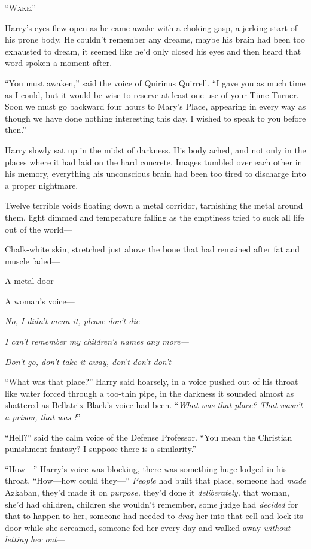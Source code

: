 \lettrine[lraise=.2]{“W}{ake.”}

\quad\quad\quad Harry’s eyes flew open as he came awake with a choking gasp, a jerking start of his prone body. He couldn’t remember any dreams, maybe his brain had been too exhausted to dream, it seemed like he’d only closed his eyes and then heard that word spoken a moment after.

“You must awaken,” said the voice of Quirinus Quirrell. “I gave you as much time as I could, but it would be wise to reserve at least one use of your Time-Turner. Soon we must go backward four hours to Mary’s Place, appearing in every way as though we have done nothing interesting this day. I wished to speak to you before then.”

Harry slowly sat up in the midst of darkness. His body ached, and not only in the places where it had laid on the hard concrete. Images tumbled over each other in his memory, everything his unconscious brain had been too tired to discharge into a proper nightmare.

Twelve terrible voids floating down a metal corridor, tarnishing the metal around them, light dimmed and temperature falling as the emptiness tried to suck all life out of the world—

Chalk-white skin, stretched just above the bone that had remained after fat and muscle faded—

A metal door—

A woman’s voice—

\emph{No, I didn’t mean it, please don’t die—}

\emph{I can’t remember my children’s names any more—}

\emph{Don’t go, don’t take it away, don’t don’t don’t—}

“What was that place?” Harry said hoarsely, in a voice pushed out of his throat like water forced through a too-thin pipe, in the darkness it sounded almost as shattered as Bellatrix Black’s voice had been. “\emph{What was that place? That wasn’t a prison, that was !}”

“Hell?” said the calm voice of the Defense Professor. “You mean the Christian punishment fantasy? I suppose there is a similarity.”

“How—” Harry’s voice was blocking, there was something huge lodged in his throat. “How—how could they—” \emph{People} had built that place, someone had \emph{made} Azkaban, they’d made it on \emph{purpose,} they’d done it \emph{deliberately,} that woman, she’d had children, children she wouldn’t remember, some judge had \emph{decided} for that to happen to her, someone had needed to \emph{drag} her into that cell and lock its door while she screamed, someone fed her every day and walked away \emph{without letting her out}—

